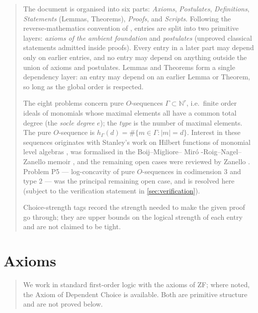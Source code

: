\documentclass[11pt,reqno]{amsart}
\providecommand{\N}{\mathbb{N}}
\begin{document}
\begin{quotation}
\noindent 
\noindent%
The document is organised into six parts: \emph{Axioms}, \emph{Postulates}, 
\emph{Definitions}, \emph{Statements} (Lemmas, Theorems), \emph{Proofs}, and 
\emph{Scripts}. Following the reverse-mathematics convention of \cite%
{simpson2009}, entries are split into two primitive layers: \emph{axioms of
the ambient foundation} and \emph{postulates} (unproved classical statements
admitted inside proofs). Every entry in a later part may depend only on
earlier entries, and no entry may depend on anything outside the union of
axioms and postulates. Lemmas and Theorems form a single dependency layer:
an entry may depend on an earlier Lemma or Theorem, so long as the global
order is respected.

\medskip \noindent The eight problems concern pure $O$-sequences $\Gamma
\subset \N^{r}$, i.e.\ finite order ideals of monomials whose maximal
elements all have a common total degree (the \emph{socle degree} $e$); the 
\emph{type} is the number of maximal elements. The pure $O$-sequence is $%
h_{\Gamma }(d)=\#\{m\in \Gamma :|m|=d\}$. Interest in these sequences
originates with Stanley's work on Hilbert functions of monomial level
algebras \cite{stanley1978}, was formalised in the Boij--Migliore-- Mir\'{o}%
-Roig--Nagel--Zanello memoir \cite{bmmnz2012}, and the remaining open cases
were reviewed by Zanello \cite{zanello2024}. Problem P5 --- log-concavity of
pure $O$-sequences in codimension $3$ and type $2$ --- was the principal
remaining open case, and is resolved here (subject to the verification
statement in \ref{sec:verification}).

\medskip \noindent Choice-strength tags record the strength needed to make
the given proof go through; they are upper bounds on the logical strength of
each entry and are not claimed to be tight.
\end{quotation}

\section{Axioms}

\begin{quotation}
\noindent 
\noindent%
We work in standard first-order logic with the axioms of \textsf{ZF}; where
noted, the Axiom of Dependent Choice is available. Both are primitive
structure and are not proved below.
\end{quotation}
\end{document}
